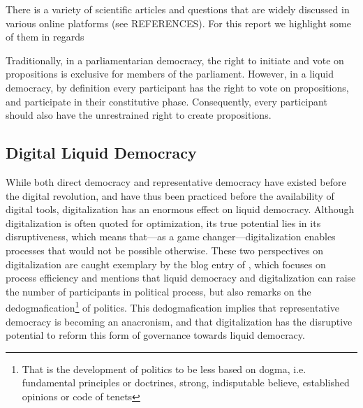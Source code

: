There is a variety of scientific articles and questions that are widely discussed in various online platforms (see REFERENCES). For this report we highlight some of them in regards



Traditionally, in a parliamentarian democracy, the right to initiate and vote on propositions is exclusive for members of the parliament.
However, in a liquid democracy, by definition every participant has the right to vote on propositions, and participate in their constitutive phase.
Consequently, every participant should also have the unrestrained right to create propositions.


\subsection{Digital Liquid Democracy}
\label{ssec:Digital_LD}
While both direct democracy and representative democracy have existed before the digital revolution, and have thus been practiced before the availability of digital tools, digitalization has an enormous effect on liquid democracy. Although digitalization is often quoted for optimization, its true potential lies in its disruptiveness, which means that---as a game changer---digitalization enables processes that would not be possible otherwise. These two perspectives on digitalization are caught exemplary by the blog entry of \textcite{Veuve2015}, which focuses on process efficiency and mentions that liquid democracy and digitalization can raise the number of participants in political process, but also remarks on the dedogmafication\footnote{That is the development of politics to be less based on dogma, i.e. fundamental principles or doctrines, strong, indisputable believe, established opinions or code of tenets}  of politics. This dedogmafication implies that representative democracy is becoming an anacronism, and that digitalization has the disruptive potential to reform this form of governance towards liquid democracy. 

